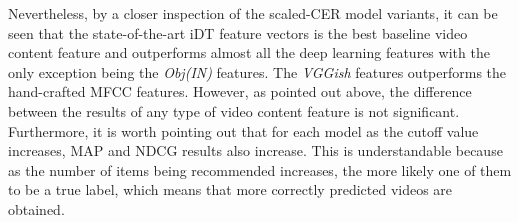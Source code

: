 \documentclass[review]{elsarticle}
\begin{document}
Nevertheless, by a closer inspection of the scaled-CER model variants, it can be seen that the state-of-the-art iDT feature vectors is the best baseline video content feature and outperforms almost all the deep learning features with the only exception being the \textit{Obj(IN)} features. The \textit{VGGish} features outperforms the hand-crafted MFCC features. However, as pointed out above, the difference between the results of any type of video content feature is not significant. Furthermore, it is worth pointing out that for each model as the cutoff value increases, MAP and NDCG results also increase. This is understandable because as the number of items being recommended increases, the more likely one of them to be a true label, which means that more correctly predicted videos are obtained.   
\end{document}
